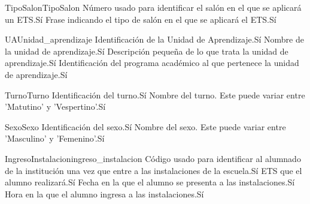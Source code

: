 \begin{cdtEntidad}{TipoSalon}{TipoSalon}
	{Número usado para identificar el salón en el que se aplicará un ETS.}{Sí}
	{Frase indicando el tipo de salón en el que se aplicará el ETS.}{Sí}
\end{cdtEntidad}
\begin{cdtEntidad}{UA}{Unidad\_aprendizaje}
	{Identificación de la Unidad de Aprendizaje.}{Sí}
	{Nombre de la unidad de aprendizaje.}{Sí}
	{Descripción pequeña de lo que trata la unidad de aprendizaje.}{Sí}
	{Identificación del programa académico al que pertenece la unidad de aprendizaje.}{Sí}
\end{cdtEntidad}
\begin{cdtEntidad}{Turno}{Turno}
	{Identificación del turno.}{Sí}
	{Nombre del turno. Este puede variar entre 'Matutino' y 'Vespertino'.}{Sí}
\end{cdtEntidad}
\begin{cdtEntidad}{Sexo}{Sexo}
	{Identificación del sexo.}{Sí}
	{Nombre del sexo. Este puede variar entre 'Masculino' y 'Femenino'.}{Sí}
\end{cdtEntidad}
\begin{cdtEntidad}{IngresoInstalacion}{ingreso\_instalacion}
	{Código usado para identificar al alumnado de la institución una vez que entre a las instalaciones de la escuela.}{Sí}
	{ETS que el alumno realizará.}{Sí}
	{Fecha en la que el alumno se presenta a las instalaciones.}{Sí}
	{Hora en la que el alumno ingresa a las instalaciones.}{Sí}
\end{cdtEntidad}
